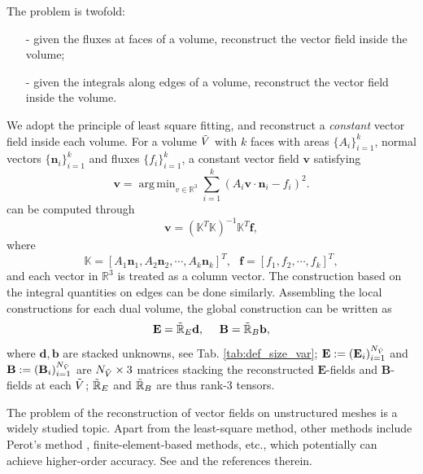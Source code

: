 \documentclass{article}
\DeclareMathOperator*{\argmin}{arg\,min}
\begin{document}
The problem is twofold:
\begin{itemize}
    \item[-] given the fluxes at faces of a volume, reconstruct the vector field inside the volume;
    \item[-] given the integrals along edges of a volume, reconstruct the vector field inside the volume. 
\end{itemize}
We adopt the principle of least square fitting, and reconstruct a \emph{constant} vector field inside each volume. For a volume $\Tilde{V}$ with $k$ faces with areas $\{A_i\}_{i=1}^k$, normal vectors $\{\mathbf{n}_i\}_{i=1}^k$ and fluxes $\{f_i\}_{i=1}^k$, a constant vector field $\mathbf{v}$ satisfying 
\begin{equation*}
    \mathbf{v} = \argmin_{v\in \mathbb{R}^3} \sum_{i=1}^k(A_i\mathbf{v} \cdot \mathbf{n}_i - f_i)^2.   
\end{equation*} can be computed through
\begin{equation*}
    \mathbf{v} = (\mathbb{K}^T\mathbb{K})^{-1}\mathbb{K}^T\mathbf{f},
\end{equation*}
where
\begin{equation*}
    \mathbb{K} = [A_1\mathbf{n}_1, A_2\mathbf{n}_2, \cdots, A_k\mathbf{n}_k]^T,\ \ \ \mathbf{f} = [f_1, f_2, \cdots, f_k]^T,
\end{equation*}
and each vector in $\mathbb{R}^3$ is treated as a column vector. The construction based on the integral quantities on edges can be done similarly. Assembling the local constructions for each dual volume, the global construction can be written as 
\begin{equation}
    \mathbf{E} = \Tilde{\mathbb{R}}_E\mathbf{d},
    \ \ \ \ 
    \mathbf{B} = \Tilde{\mathbb{R}}_B\mathbf{b}, \label{equ:reconstruction}
\end{equation}
where $\mathbf{d}, \mathbf{b}$ are stacked unknowns, see Tab. \ref{tab:def_size_var}; $\mathbf{E} := (\mathbf{E}_i)_{i=1}^{N_{\Tilde{V}}}$ and $\mathbf{B} := (\mathbf{B}_i)_{i=1}^{N_{\Tilde{V}}}$ are $N_{\Tilde{V}} \times 3$ matrices stacking the reconstructed $\mathbf{E}$-fields and $\mathbf{B}$-fields at each $\Tilde{V}$; $\Tilde{\mathbb{R}}_E$ and $\Tilde{\mathbb{R}}_B$ are thus rank-3 tensors.

The problem of the reconstruction of vector fields on unstructured meshes is a widely studied topic. Apart from the least-square method, other methods include Perot's method \citep{perot_2000}, finite-element-based methods, etc., which potentially can achieve higher-order accuracy. See \cite[][sec. 3.4.4]{fuchs_2021} and the references therein.  
\end{document}
